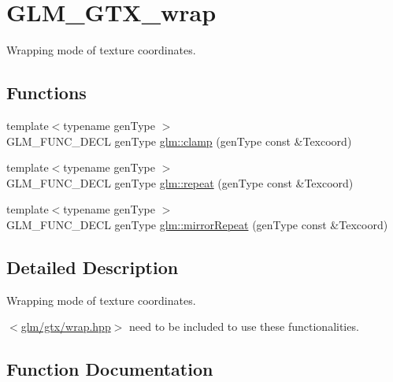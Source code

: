 \hypertarget{group__gtx__wrap}{}\section{G\+L\+M\+\_\+\+G\+T\+X\+\_\+wrap}
\label{group__gtx__wrap}


Wrapping mode of texture coordinates.  


\subsection*{Functions}
\begin{DoxyCompactItemize}
\item 
{\footnotesize template$<$typename gen\+Type $>$ }\\G\+L\+M\+\_\+\+F\+U\+N\+C\+\_\+\+D\+E\+CL gen\+Type \hyperlink{group__gtx__wrap_ga6c0cc6bd1d67ea1008d2592e998bad33}{glm\+::clamp} (gen\+Type const \&Texcoord)
\item 
{\footnotesize template$<$typename gen\+Type $>$ }\\G\+L\+M\+\_\+\+F\+U\+N\+C\+\_\+\+D\+E\+CL gen\+Type \hyperlink{group__gtx__wrap_ga809650c6310ea7c42666e918c117fb6f}{glm\+::repeat} (gen\+Type const \&Texcoord)
\item 
{\footnotesize template$<$typename gen\+Type $>$ }\\G\+L\+M\+\_\+\+F\+U\+N\+C\+\_\+\+D\+E\+CL gen\+Type \hyperlink{group__gtx__wrap_ga16a89b0661b60d5bea85137bbae74d73}{glm\+::mirror\+Repeat} (gen\+Type const \&Texcoord)
\end{DoxyCompactItemize}


\subsection{Detailed Description}
Wrapping mode of texture coordinates. 

$<$\hyperlink{wrap_8hpp}{glm/gtx/wrap.\+hpp}$>$ need to be included to use these functionalities. 

\subsection{Function Documentation}

